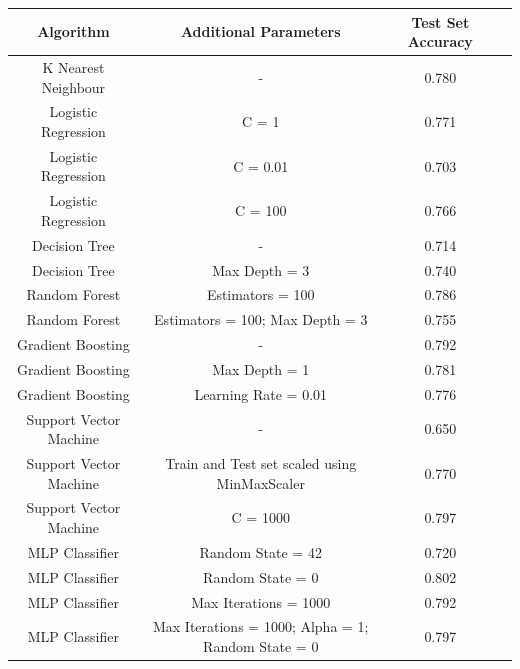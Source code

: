 \documentclass[12pt]{article}
\begin{document}
{
\clearpage
\begin{landscape}
\centering
\begin{table}[]
\centering
\begin{tabular}{|c|c|c|c|}
\hline
Algorithm              & Additional Parameters                               & Test Set Accuracy \\ \hline
K Nearest Neighbour    & -                                                   & 0.780             \\ \hline
Logistic Regression    & C = 1                                               & 0.771             \\ \hline
Logistic Regression    & C = 0.01                                            & 0.703             \\ \hline
Logistic Regression    & C = 100                                             & 0.766             \\ \hline
Decision Tree          & -                                                   & 0.714             \\ \hline
Decision Tree          & Max Depth = 3                                       & 0.740             \\ \hline
Random Forest          & Estimators = 100                                    & 0.786             \\ \hline
Random Forest          & Estimators = 100; Max Depth = 3                     & 0.755             \\ \hline
Gradient Boosting      & -                                                   & 0.792             \\ \hline
Gradient Boosting      & Max Depth = 1                                       & 0.781             \\ \hline
Gradient Boosting      & Learning Rate = 0.01                                & 0.776             \\ \hline
Support Vector Machine & -                                                   & 0.650             \\ \hline
Support Vector Machine & Train and Test set scaled using MinMaxScaler        & 0.770             \\ \hline
Support Vector Machine & C = 1000                                            & 0.797             \\ \hline
MLP Classifier         & Random State = 42                                   & 0.720             \\ \hline
MLP Classifier         & Random State = 0                                    & 0.802             \\ \hline
MLP Classifier         & Max Iterations = 1000                               & 0.792             \\ \hline
MLP Classifier         & Max Iterations = 1000; Alpha = 1; Random State = 0  & 0.797             \\ \hline
\end{tabular}
\end{table}
\label{table:3}
\end{landscape}
\clearpage
}
\end{document}
